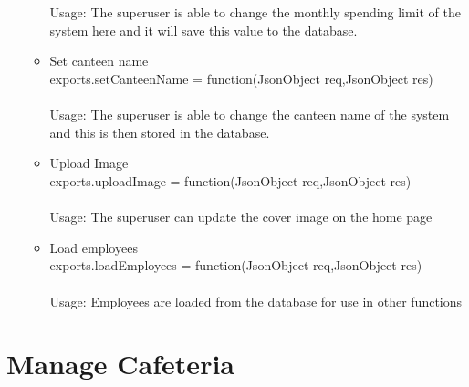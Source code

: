 \documentclass[a4paper,12pt]{report}
\begin{document}
\begin{enumerate}
\begin{itemize}
		\\ \\ Usage: The superuser is able to change the monthly spending limit of the system here and it will save this value to the database. 
		\item Set canteen name \\ exports.setCanteenName = function(JsonObject req,JsonObject res)
		\\ \\ Usage: The superuser is able to change the canteen name of the system and this is then stored in the database.
		\item Upload Image \\ exports.uploadImage = function(JsonObject req,JsonObject res) \\ \\
		Usage: The superuser can update the cover image on the home page
		\item Load employees \\ exports.loadEmployees = function(JsonObject req,JsonObject res)
		\\ \\ Usage: Employees are loaded from the database for use in other functions
	\end{itemize}
\end{enumerate}

\section{Manage Cafeteria}
\end{document}
